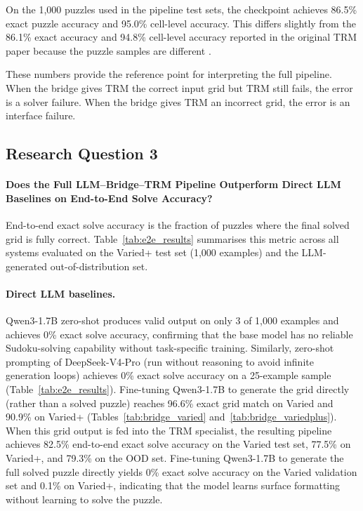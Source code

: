 \documentclass[11pt]{article}
\begin{document}
On the 1,000 puzzles used in the pipeline test sets, the checkpoint achieves 86.5\% exact puzzle accuracy and 95.0\% cell-level accuracy.
This differs slightly from the 86.1\% exact accuracy and 94.8\% cell-level accuracy reported in the original TRM paper because the puzzle samples are different \cite{jolicoeur-martineauLessMoreRecursive2025}.

These numbers provide the reference point for interpreting the full pipeline.
When the bridge gives TRM the correct input grid but TRM still fails, the error is a solver failure.
When the bridge gives TRM an incorrect grid, the error is an interface failure.

\subsection*{Research Question 3}
\label{sec:end_to_end_pipeline_results}

\paragraph{Does the Full LLM--Bridge--TRM Pipeline Outperform Direct LLM Baselines on End-to-End Solve Accuracy?}
End-to-end exact solve accuracy is the fraction of puzzles where the final solved grid is fully correct.
Table~\ref{tab:e2e_results} summarises this metric across all systems evaluated on the Varied+ test set (1,000 examples) and the LLM-generated out-of-distribution set.

\paragraph{Direct LLM baselines.}
Qwen3-1.7B zero-shot produces valid output on only 3 of 1,000 examples and achieves 0\% exact solve accuracy, confirming that the base model has no reliable Sudoku-solving capability without task-specific training.
Similarly, zero-shot prompting of DeepSeek-V4-Pro (run without reasoning to avoid infinite generation loops) achieves 0\% exact solve accuracy on a 25-example sample (Table~\ref{tab:e2e_results}).
Fine-tuning Qwen3-1.7B to generate the grid directly (rather than a solved puzzle) reaches 96.6\% exact grid match on Varied and 90.9\% on Varied+ (Tables~\ref{tab:bridge_varied} and~\ref{tab:bridge_variedplus}).
When this grid output is fed into the TRM specialist, the resulting pipeline achieves 82.5\% end-to-end exact solve accuracy on the Varied test set, 77.5\% on Varied+, and 79.3\% on the OOD set.
Fine-tuning Qwen3-1.7B to generate the full solved puzzle directly yields 0\% exact solve accuracy on the Varied validation set and 0.1\% on Varied+, indicating that the model learns surface formatting without learning to solve the puzzle.
\end{document}
